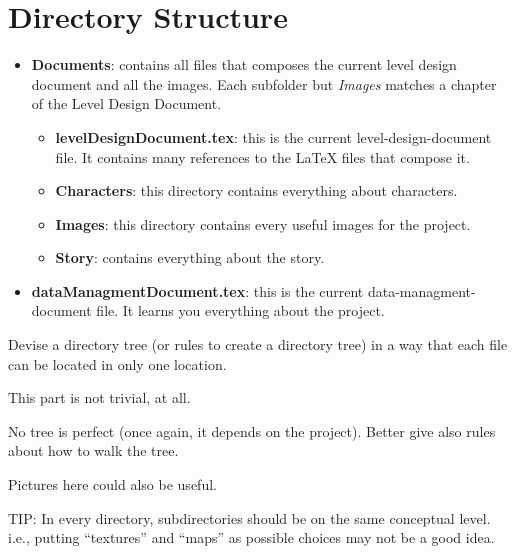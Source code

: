 \documentclass[12pt]{article}
\begin{document}
\section{Directory Structure}
\begin{itemize}
\item \textbf{Documents}: contains all files that composes the current level design document and all the images. Each subfolder but \textit{Images} matches a chapter of the Level Design Document.
  \begin{itemize}
    \item \textbf{levelDesignDocument.tex}: this is the current level-design-document file. It contains many references to the LaTeX files that compose it.
    
    \item \textbf{Characters}: this directory contains everything about characters.
      
    \item \textbf{Images}: this directory contains every useful images for the project.
      
    \item \textbf{Story}: contains everything about the story.
  \end{itemize}
  \item \textbf{dataManagmentDocument.tex}: this is the current data-managment-document file. It learns you everything about the project.
\end{itemize}

Devise a directory tree (or rules to create a directory tree) in a way that each file can be located in only one location.

This part is not trivial, at all.

No tree is perfect (once again, it depends on the project). Better give also rules about how to walk the tree.

Pictures here could also be useful.

TIP: In every directory, subdirectories should be on the same conceptual level. i.e., putting “textures” and “maps” as possible choices may not be a good idea.
\end{document}
